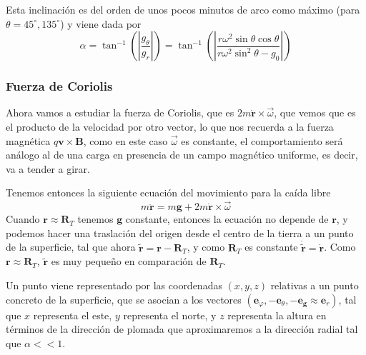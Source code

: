 Esta inclinación es del orden de unos pocos minutos de arco como máximo (para $\theta= 45^\circ ,135^\circ $) y viene dada por
\begin{equation} \label{6.1.1}
    \alpha = \tan^{-1}\left(\left|\frac{g_\theta}{g_r}\right|\right) = \tan^{-1}\left(\left|\frac{r\omega^2 \sin \theta \cos \theta}{r\omega^2\sin^2\theta-g_0}\right|\right)
\end{equation} 
\newpage
\subsubsection{Fuerza de Coriolis}
Ahora vamos a estudiar la fuerza de Coriolis, que es $2 m \dot{\mathbf{r}} \times  \vec{\omega}$, que vemos que es el producto de la velocidad por otro vector, lo que nos recuerda a la fuerza magnética $q \mathbf{v} \times \mathbf{B}$, como en este caso $\vec\omega$ es constante, el comportamiento será análogo al de una carga en presencia de un campo magnético uniforme, es decir, va a tender a girar.

Tenemos entonces la siguiente ecuación del movimiento para la caída libre
\begin{equation} \label{6.1.1}
    m\ddot{\mathbf{r}}=  m\mathbf{g} + 2 m \dot{\mathbf{r}} \times  \vec{\omega}
\end{equation} 
Cuando $\mathbf{r} \approx \mathbf{R}_T$ tenemos $\mathbf{g}$ constante, entonces la ecuación no depende de $\mathbf{r}$, y podemos hacer una traslación del origen desde el centro de la tierra a un punto de la superficie, tal que ahora $\tilde{\mathbf{r}} = \mathbf{r} - \mathbf{R}_T$, y como $\mathbf{R}_T$ es constante $\dot{\tilde{\mathbf{r}}} = \dot{\mathbf{r}}$. Como $\mathbf{r} \approx \mathbf{R}_T$, $\tilde{\mathbf{r}}$ es muy pequeño en comparación de $\mathbf{R}_T$.

Un punto viene representado por las coordenadas $(x,y,z)$ relativas a un punto concreto de la superficie, que se asocian a los vectores $(\mathbf{e}_\varphi,-\mathbf{e}_\theta,-\mathbf{e}_\mathbf{g} \approx \mathbf{e}_r)$, tal que $x$ representa el este, $y$ representa el norte, y $z$ representa la altura en términos de la dirección de plomada que aproximaremos a la dirección radial tal que $\alpha << 1$.

